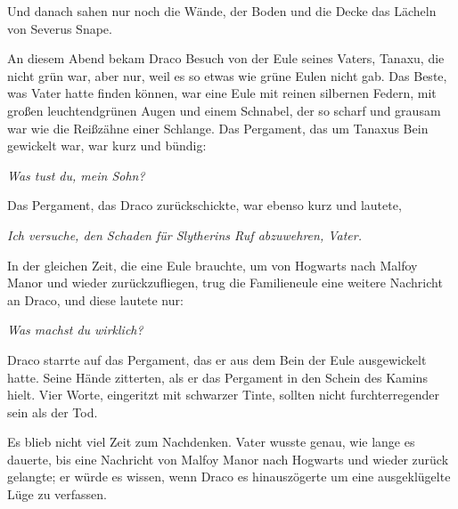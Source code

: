 Und danach sahen nur noch die Wände, der Boden und die Decke das Lächeln von Severus Snape.

\later

An diesem Abend bekam Draco Besuch von der Eule seines Vaters, Tanaxu, die nicht grün war, aber nur, weil es so etwas wie grüne Eulen nicht gab. Das Beste, was Vater hatte finden können, war eine Eule mit reinen silbernen Federn, mit großen leuchtendgrünen Augen und einem Schnabel, der so scharf und grausam war wie die Reißzähne einer Schlange. Das Pergament, das um Tanaxus Bein gewickelt war, war kurz und bündig:

\emph{Was tust du, mein Sohn?}

Das Pergament, das Draco zurückschickte, war ebenso kurz und lautete,

\emph{Ich versuche, den Schaden für Slytherins Ruf abzuwehren, Vater.}

In der gleichen Zeit, die eine Eule brauchte, um von Hogwarts nach Malfoy Manor und wieder zurückzufliegen, trug die Familieneule eine weitere Nachricht an Draco, und diese lautete nur:

\emph{Was machst du wirklich?}

Draco starrte auf das Pergament, das er aus dem Bein der Eule ausgewickelt hatte. Seine Hände zitterten, als er das Pergament in den Schein des Kamins hielt. Vier Worte, eingeritzt mit schwarzer Tinte, sollten nicht furchterregender sein als der Tod.

Es blieb nicht viel Zeit zum Nachdenken. Vater wusste genau, wie lange es dauerte, bis eine Nachricht von Malfoy Manor nach Hogwarts und wieder zurück gelangte; er würde es wissen, wenn Draco es hinauszögerte um eine ausgeklügelte Lüge zu verfassen.

